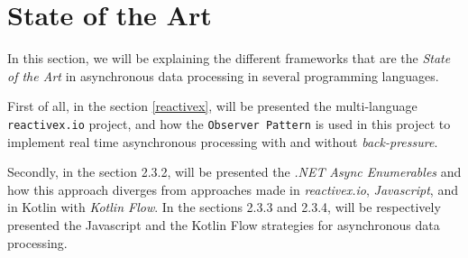 

\section{State of the Art} %
\label{sec:state_of_the_art}

In this section, we will be explaining the different frameworks that are the \textit{State of the Art} in asynchronous data processing in several programming languages.

First of all, in the section \ref{reactivex}, will be presented the multi-language \texttt{reactivex.io} project, and how the \texttt{Observer Pattern} is used in this project to implement real time asynchronous processing with and without \textit{back-pressure}.

Secondly, in the section 2.3.2, will be presented the \textit{.NET} \textit{Async Enumerables} and how this approach diverges from approaches made in \textit{reactivex.io}, \textit{Javascript}, and in Kotlin with \textit{Kotlin Flow}.
In the sections 2.3.3 and 2.3.4, will be respectively presented the Javascript and the Kotlin Flow strategies for asynchronous data processing.

